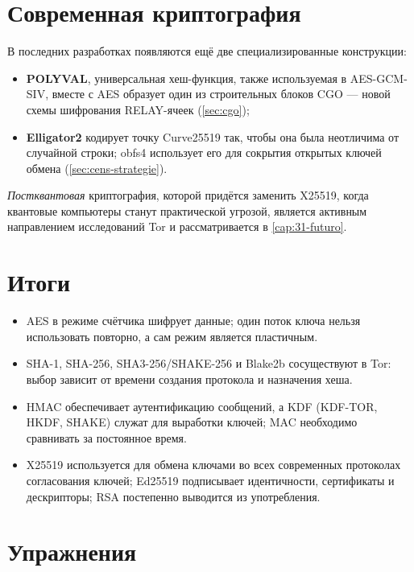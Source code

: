 \section{Современная криптография}\label{sec:cripto-recente}

В последних разработках появляются ещё две специализированные конструкции:
\begin{itemize}
  \item \textbf{POLYVAL}, универсальная хеш-функция, также используемая в AES-GCM-SIV, вместе с AES образует один из строительных блоков CGO --- новой схемы шифрования RELAY-ячеек (\cref{sec:cgo});
  \item \textbf{Elligator2} кодирует точку Curve25519 так, чтобы она была неотличима от случайной строки; obfs4 использует его для сокрытия открытых ключей обмена (\cref{sec:cens-strategie}).
\end{itemize}
\emph{Постквантовая} криптография, которой придётся заменить X25519, когда квантовые компьютеры станут практической угрозой, является активным направлением исследований Tor и рассматривается в \cref{cap:31-futuro}.

\section*{Итоги}
\begin{itemize}
  \item AES в режиме счётчика шифрует данные; один поток ключа нельзя использовать повторно, а сам режим является пластичным.
  \item SHA-1, SHA-256, SHA3-256/SHAKE-256 и Blake2b сосуществуют в Tor: выбор зависит от времени создания протокола и назначения хеша.
  \item HMAC обеспечивает аутентификацию сообщений, а KDF (KDF-TOR, HKDF, SHAKE) служат для выработки ключей; MAC необходимо сравнивать за постоянное время.
  \item X25519 используется для обмена ключами во всех современных протоколах согласования ключей; Ed25519 подписывает идентичности, сертификаты и дескрипторы; RSA постепенно выводится из употребления.
\end{itemize}

\section*{Упражнения}

